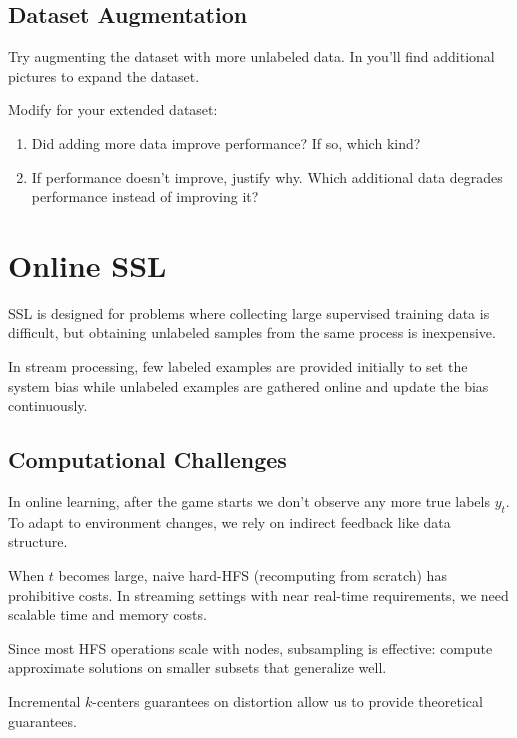 \documentclass[11pt]{article}
\begin{document}
\subsection{Dataset Augmentation}

Try augmenting the dataset with more unlabeled data. In 
you'll find additional pictures to expand the dataset.

Modify  for your extended dataset:

\begin{questionbox}
\begin{enumerate}[leftmargin=*,resume]
	\item Did adding more data improve performance? If so, which kind?
	\item If performance doesn't improve, justify why. Which additional
	data degrades performance instead of improving it?
\end{enumerate}
\end{questionbox}

\section{Online SSL}

SSL is designed for problems where collecting large supervised training data
is difficult, but obtaining unlabeled samples from the same process is inexpensive.

In stream processing, few labeled examples are provided initially to set
the system bias while unlabeled examples are gathered online and update
the bias continuously.

\subsection{Computational Challenges}

In online learning, after the game starts we don't observe any more true labels $y_t$.
To adapt to environment changes, we rely on indirect feedback like data structure.

When $t$ becomes large, naive hard-HFS (recomputing from scratch) has prohibitive costs.
In streaming settings with near real-time requirements, we need scalable time and
memory costs.

Since most HFS operations scale with nodes, subsampling is effective:
compute approximate solutions on smaller subsets that generalize well.

Incremental $k$-centers \cite{charikar2004incremental} guarantees on distortion
allow us to provide theoretical guarantees.
\end{document}
